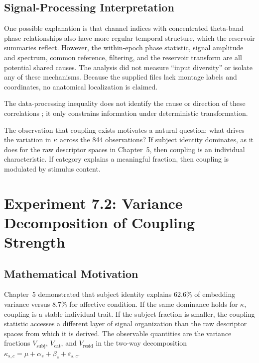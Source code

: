 \subsection{Signal-Processing Interpretation}

One possible explanation is that channel indices with concentrated theta-band phase relationships also have more regular temporal structure, which the reservoir summaries reflect. However, the within-epoch phase statistic, signal amplitude and spectrum, common reference, filtering, and the reservoir transform are all potential shared causes. The analysis did not measure ``input diversity'' or isolate any of these mechanisms. Because the supplied files lack montage labels and coordinates, no anatomical localization is claimed.

The data-processing inequality does not identify the cause or direction of these correlations \cite{cover_elements_2006}; it only constrains information under deterministic transformation.

The observation that coupling exists motivates a natural question: what drives the variation in $\kappa$ across the 844 observations? If subject identity dominates, as it does for the raw descriptor spaces in Chapter~5, then coupling is an individual characteristic. If category explains a meaningful fraction, then coupling is modulated by stimulus content.


\section{Experiment 7.2: Variance Decomposition of Coupling Strength}
\label{sec:exp7_variance}

\subsection{Mathematical Motivation}

Chapter~5 demonstrated that subject identity explains 62.6\% of embedding variance versus 8.7\% for affective condition. If the same dominance holds for $\kappa$, coupling is a stable individual trait. If the subject fraction is smaller, the coupling statistic accesses a different layer of signal organization than the raw descriptor spaces from which it is derived. The observable quantities are the variance fractions $V_{\text{subj}}$, $V_{\text{cat}}$, and $V_{\text{resid}}$ in the two-way decomposition $\kappa_{s,c} = \mu + \alpha_s + \beta_c + \varepsilon_{s,c}$.

